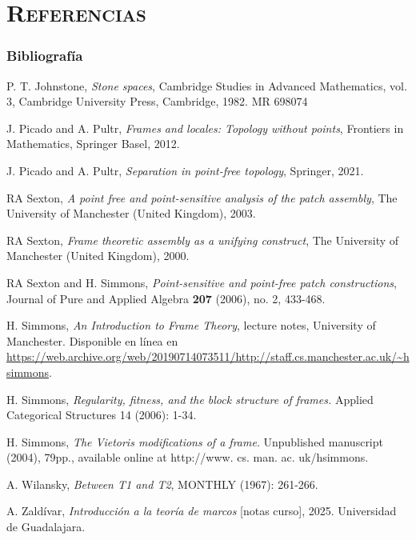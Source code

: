 \documentclass[compress,12pt]{beamer}
\begin{document}
\section*{\textsc{Referencias}}
\begin{frame}[allowframebreaks]
\frametitle{Bibliografía}
\begin{thebibliography}{20}

 P. T. Johnstone, \textit{Stone spaces}, Cambridge Studies in Advanced Mathematics, vol. 3, Cambridge University Press, Cambridge, 1982. MR 698074



 J. Picado and A. Pultr, \textit{Frames and locales: Topology without points}, Frontiers in Mathematics, Springer Basel, 2012.

 J. Picado and A. Pultr, \textit{Separation in point-free topology}, Springer, 2021.

 RA Sexton, \textit{A point free and point-sensitive analysis of the patch assembly}, The University of Manchester (United Kingdom), 2003.

 RA Sexton, \textit{Frame theoretic assembly as a unifying construct}, The University of Manchester (United Kingdom), 2000.

 RA Sexton and H. Simmons, \textit{Point-sensitive and point-free patch constructions}, Journal of Pure and Applied Algebra \textbf{207} (2006), no. 2, 433-468.

 H. Simmons, \textit{An Introduction to Frame Theory}, lecture notes, University of Manchester. Disponible en línea en \url{https://web.archive.org/web/20190714073511/http://staff.cs.manchester.ac.uk/~hsimmons}.

 H. Simmons, \textit{Regularity, fitness, and the block structure of frames.} Applied Categorical Structures 14 (2006): 1-34.


 H. Simmons, \textit{The Vietoris modifications of a frame}. Unpublished manuscript (2004), 79pp., available online at http://www. cs. man. ac. uk/hsimmons.

 A. Wilansky, \textit{Between T1 and T2}, MONTHLY (1967): 261-266.

 A. Zaldívar, \textit{Introducción a la teoría de marcos} [notas curso], 2025. Universidad de Guadalajara.
\end{thebibliography}
\end{frame}
\end{document}
